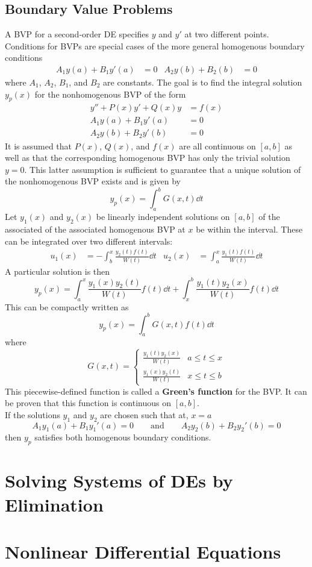 \documentclass[./Differential Equations]{subfiles}
\begin{document}
		\subsection{Boundary Value Problems}
			A BVP for a second-order DE specifies \(y\) and \(y'\) at two different points. Conditions for BVPs are special cases of the more general homogenous boundary conditions
				\begin{align*}
					A_1y(a) + B_1y'(a) &= 0 &
						A_2y(b) + B_2(b) &= 0
				\end{align*}
				where \(A_1\), \(A_2\), \(B_1\), and \(B_2\) are constants. The goal is to find the integral solution \(y_p(x)\) for the nonhomogenous BVP of the form
				\begin{align*}
					y'' + P(x)y' + Q(x)y &= f(x) \\
					A_1y(a) + B_1y'(a) &= 0 \\
					A_2y(b) + B_2y'(b) &= 0
				\end{align*}
				It is assumed that \(P(x)\), \(Q(x)\), and \(f(x)\) are all continuous on \([a, b]\) as well as that the corresponding homogenous BVP has only the trivial solution \(y = 0\). This latter assumption is sufficient to guarantee that a unique solution of the nonhomogenous BVP exists and is given by
				\[y_p(x) = \int_a^b G(x, t) \dd{t}\]
				Let \(y_1(x)\) and \(y_2(x)\) be linearly independent solutions on \([a, b]\) of the associated of the associated homogenous BVP at \(x\) be within the interval. These can be integrated over two different intervals:
					\begin{align*}
						u_1(x) &= -\int_b^x \frac{y_2(t)f(t)}{W(t)} \dd{t} &
							u_2(x) &= \int_a^x \frac{y_1(t)f(t)}{W(t)} \dd{t}
					\end{align*}
					A particular solution is then
					\[y_p(x) = \int_a^x \frac{y_1(x)y_2(t)}{W(t)}f(t) \dd{t} + \int_x^b \frac{y_1(t)y_2(x)}{W(t)}f(t) \dd{t}\]
					This can be compactly written as
					\[y_p(x) = \int_a^b G(x, t) f(t) \dd{t}\]
					where
					\[
						G(x, t) = \begin{cases}
 							\frac{y_1(t)y_2(x)}{W(t)} & a \le t \le x \\
 							\frac{y_1(x)y_2(t)}{W(t)} & x \le t \le b
 						\end{cases}
 					\]
 					This piecewise-defined function is called a \textbf{Green's function} for the BVP. It can be proven that this function is continuous on \([a, b]\). \\
 					If the solutions \(y_1\) and \(y_2\) are chosen such that at, \(x = a\)
 					\[
 						A_1y_1(a) + B_1y_1'(a) = 0\qquad \text{and} \qquad
 						A_2y_2(b) + B_2y_2'(b) = 0
 					\]
 					then \(y_p\) satisfies both homogenous boundary conditions.
	\section{Solving Systems of DEs by Elimination}
	\section{Nonlinear Differential Equations}
\end{document}

